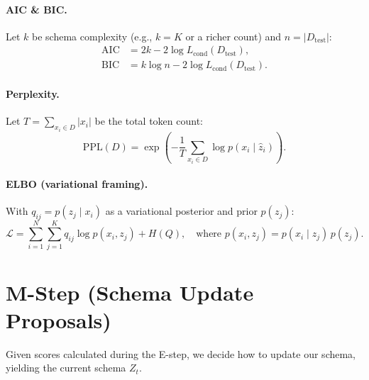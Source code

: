 \documentclass[11pt]{article}
\begin{document}
\paragraph{AIC \& BIC.}
Let $k$ be schema complexity (e.g., $k=K$ or a richer count) and $n = |D_{\mathrm{test}}|$:
\begin{align}
\mathrm{AIC} &= 2k - 2 \log L_{\mathrm{cond}}(D_{\mathrm{test}}), \tag{11} \\
\mathrm{BIC} &= k \log n - 2 \log L_{\mathrm{cond}}(D_{\mathrm{test}}). \tag{12}
\end{align}

\paragraph{Perplexity.}
Let $T = \sum_{x_i \in D} |x_i|$ be the total token count:
\begin{equation}
\mathrm{PPL}(D) = \exp\!\left(-\frac{1}{T} \sum_{x_i \in D} \log p\!\left(x_i \mid \hat{z}_i\right)\right). \tag{13}
\end{equation}

\paragraph{ELBO (variational framing).}
With $q_{ij} = p(z_j \mid x_i)$ as a variational posterior and prior $p(z_j)$:
\begin{equation}
\mathcal{L} = \sum_{i=1}^N \sum_{j=1}^K q_{ij} \log p(x_i, z_j) + H(Q),
\quad \text{where } p(x_i, z_j) = p(x_i \mid z_j)\, p(z_j). \tag{14}
\end{equation}

\section{M-Step (Schema Update Proposals)}
Given scores calculated during the E-step, we decide how to update our schema, yielding the current schema $Z_t$.
\end{document}
